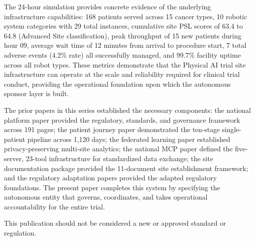 The 24-hour simulation \cite{main-repo} provides concrete evidence of the underlying
infrastructure capabilities: 168 patients served across 15 cancer types, 10 robotic
system categories with 29 total instances, cumulative site PSL scores of 63.4 to 64.8
(Advanced Site classification), peak throughput of 15 new patients during hour 09,
average wait time of 12 minutes from arrival to procedure start, 7 total adverse events
(4.2\% rate) all successfully managed, and 99.7\% facility uptime across all robot types.
These metrics demonstrate that the Physical AI trial site infrastructure can operate at
the scale and reliability required for clinical trial conduct, providing the operational
foundation upon which the autonomous sponsor layer is built.

The prior papers in this series established the necessary components: the national
platform paper \cite{national-platform-paper} provided the regulatory, standards, and
governance framework across 191 pages; the patient journey paper
\cite{patient-journey-paper} demonstrated the ten-stage single-patient pipeline across
1,120 days; the federated learning paper \cite{fl-paper} established privacy-preserving
multi-site analytics; the national MCP paper \cite{national-mcp-paper} defined the
five-server, 23-tool infrastructure for standardized data exchange; the site
documentation package \cite{site-docs} provided the 11-document site establishment
framework; and the regulatory adaptation papers \cite{ich-adapt, cfr50-adapt,
cfr312-adapt} provided the adapted regulatory foundations. The present paper completes
this system by specifying the autonomous entity that governs, coordinates, and takes
operational accountability for the entire trial.

This publication should not be considered a new or approved standard or regulation.
